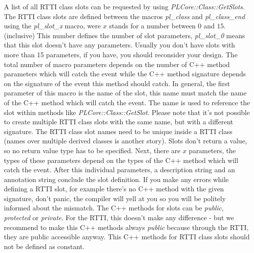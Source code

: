 A list of all \ac{RTTI} class slots can be requested by using \emph{PLCore::Class::GetSlots}. The \ac{RTTI} class slots are defined between the macros \emph{pl\_class} and \emph{pl\_class\_end} using the \emph{pl\_slot\_x} macro, were $x$ stands for a number between $0$ and $15$. (inclusive) This number defines the number of slot parameters, \emph{pl\_slot\_0} means that this slot doesn't have any parameters. Usually you don't have slots with more than 15 parameters, if you have, you should reconsider your design. The total number of macro parameters depends on the number of C++ method parameters which will catch the event while the C++ method signature depends on the signature of the event this method should catch. In general, the first parameter of this macro is the name of the slot, this name must match the name of the C++ method which will catch the event. The name is used to reference the slot within methods like \emph{PLCore::Class::GetSlot}. Please note that it's not possible to create multiple \ac{RTTI} class slots with the same name, but with a different signature. The \ac{RTTI} class slot names need to be unique inside a \ac{RTTI} class (names over multiple derived classes is another story). Slots don't return a value, so no return value type has to be specified. Next, there are $x$ parameters, the types of these parameters depend on the types of the C++ method which will catch the event. After this individual parameters, a description string and an annotation string conclude the slot definition. If you make any errors while defining a \ac{RTTI} slot, for example there's no C++ method with the given signature, don't panic, the compiler will yell at you so you will be politely informed about the mismatch. The C++ methods for slots can be \emph{public}, \emph{protected} or \emph{private}. For the \ac{RTTI}, this doesn't make any difference - but we recommend to make this C++ methods always \emph{public} because through the \ac{RTTI}, they are public accessible anyway. This C++ methods for \ac{RTTI} class slots should not be defined as constant.

